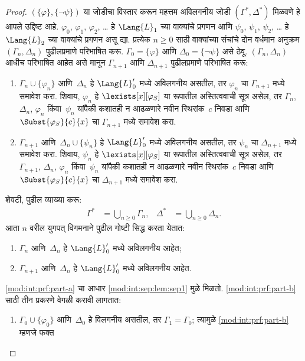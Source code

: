 \begin{proof}
$(\{ \varphi \}, \{\lnot\psi\})$ या जोडीचा विस्तार करून महत्तम अविलगनीय जोडी
$(\Gamma^*, \Delta^*)$ मिळवणे हे आपले उद्दिष्ट आहे. $\varphi_0$, $\varphi_1$,
$\varphi_2$, \dots{} हे $\Lang{L}_1$ च्या वाक्यांचे प्रगणन आणि $\psi_0$,
$\psi_1$, $\psi_2$, \dots{} हे $\Lang{L}_2$ च्या वाक्यांचे प्रगणन असू
द्या. प्रत्येक $n \ge 0$ साठी वाक्यांच्या संचांचे दोन वर्धमान अनुक्रम
$(\Gamma_n, \Delta_n)$ पुढीलप्रमाणे परिभाषित करू. $\Gamma_0 = \{ \varphi\}$
आणि $\Delta_0 = \{\lnot \psi \}$ असे ठेवू. $(\Gamma_n, \Delta_n)$ आधीच
परिभाषित आहेत असे मानून $\Gamma_{n+1}$ आणि $\Delta_{n+1}$ पुढीलप्रमाणे
परिभाषित करू:
\begin{enumerate}
\item $\Gamma_n \cup \{\varphi_n \}$ आणि~$\Delta_n$ हे $\Lang{L}'_0$ मध्ये
  अविलगनीय असतील, तर $\varphi_n$ चा $\Gamma_{n+1}$ मध्ये समावेश करा. शिवाय,
  $\varphi_n$ हे $\lexists[x][\varphi_{S}]$ या रूपातील अस्तित्ववाची सूत्र असेल,
  तर $\Gamma_n$, $\Delta_n$, $\varphi_n$ किंवा~$\psi_n$ यांपैकी कशातही न आढळणारे
  नवीन स्थिरांक~$c$ निवडा आणि $\Subst{\varphi_{S}}{c}{x}$ चा $\Gamma_{n+1}$
  मध्ये समावेश करा.
\item $\Gamma_{n+1}$ आणि~$\Delta_n \cup \{\psi_n \}$ हे $\Lang{L}'_0$
  मध्ये अविलगनीय असतील, तर $\psi_n$ चा $\Delta_{n+1}$ मध्ये समावेश करा.
  शिवाय, $\psi_n$ हे $\lexists[x][\varphi_{S}]$ या रूपातील अस्तित्ववाची सूत्र
  असेल, तर $\Gamma_{n+1}$, $\Delta_n$, $\varphi_n$ किंवा~$\psi_n$ यांपैकी कशातही
  न आढळणारे नवीन स्थिरांक~$c$ निवडा आणि $\Subst{\varphi_{S}}{c}{x}$ चा
  $\Delta_{n+1}$ मध्ये समावेश करा.
\end{enumerate}
शेवटी, पुढील व्याख्या करू:
\begin{align*}
  \Gamma^* & = \bigcup_{n\ge 0} \Gamma_n, &
  \Delta^* & = \bigcup_{n\ge 0} \Delta_n.
\end{align*}
आता $n$ वरील युगपत् विगमनाने पुढील गोष्टी सिद्ध करता येतात:
\begin{enumerate}
\item\label{mod:int:prf:part-a} $\Gamma_n$ आणि~$\Delta_n$ हे $\Lang{L}'_0$ मध्ये
  अविलगनीय आहेत;
\item\label{mod:int:prf:part-b} $\Gamma_{n+1}$ आणि~$\Delta_n$ हे $\Lang{L}'_0$
  मध्ये अविलगनीय आहेत.
\end{enumerate}
\ref{mod:int:prf:part-a} चा आधार \ref{mod:int:sep:lem:sep1} मुळे मिळतो. \ref{mod:int:prf:part-b}
साठी तीन प्रकरणे वेगळी करावी लागतात:
\begin{enumerate}
\item $\Gamma_0 \cup \{\varphi_0 \}$ आणि~$\Delta_0$ हे विलगनीय असतील, तर
  $\Gamma_1 = \Gamma_0$; त्यामुळे \ref{mod:int:prf:part-b} म्हणजे फक्त

\end{enumerate}
\end{proof}
